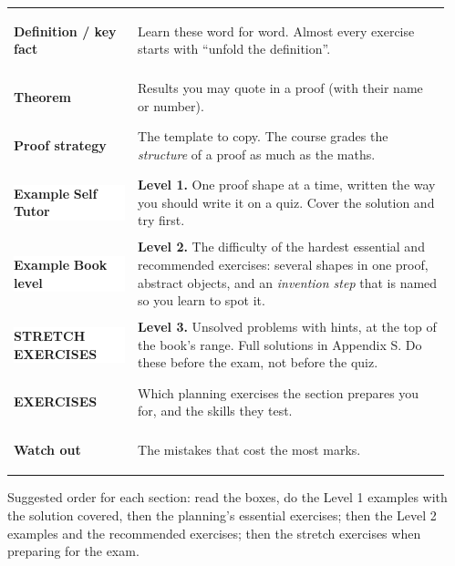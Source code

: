 \begin{center}\sffamily\small
\begin{tabular}{@{}p{0.27\linewidth}p{0.68\linewidth}@{}}
\colorbox{hyellow}{\strut\textbf{Definition / key fact}} & Learn these word for word. Almost every exercise starts with ``unfold the definition''.\\[3pt]
\colorbox{hlight}{\strut\textbf{Theorem}} & Results you may quote in a proof (with their name or number).\\[3pt]
\colorbox{hgreen}{\strut\textbf{Proof strategy}} & The template to copy. The course grades the \emph{structure} of a proof as much as the maths.\\[3pt]
\colorbox{white}{\strut\textcolor{hblue}{\textbf{Example}} \textcolor{horange}{\textbf{Self Tutor}}} & \textbf{Level 1.} One proof shape at a time, written the way you should write it on a quiz. Cover the solution and try first.\\[3pt]
\colorbox{white}{\strut\textcolor{hpurple}{\textbf{Example}} \textcolor{hpurple}{\textbf{Book level}}} & \textbf{Level 2.} The difficulty of the hardest essential and recommended exercises: several shapes in one proof, abstract objects, and an \emph{invention step} that is named so you learn to spot it.\\[3pt]
\colorbox{white}{\strut\textcolor{hpurple}{\textbf{STRETCH EXERCISES}}} & \textbf{Level 3.} Unsolved problems with hints, at the top of the book's range. Full solutions in Appendix S. Do these before the exam, not before the quiz.\\[3pt]
\colorbox{hpurplebg}{\strut\textbf{EXERCISES}} & Which planning exercises the section prepares you for, and the skills they test.\\[3pt]
\colorbox{hredbg}{\strut\textbf{Watch out}} & The mistakes that cost the most marks.
\end{tabular}
\end{center}

Suggested order for each section: read the boxes, do the Level 1 examples with the solution covered, then the planning's essential exercises; then the Level 2 examples and the recommended exercises; then the stretch exercises when preparing for the exam.

